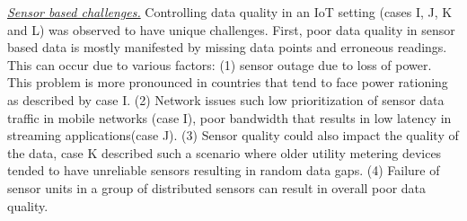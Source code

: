 \underline{\emph{Sensor based challenges.}} Controlling data quality in an IoT setting (cases I, J, K and L) was observed to have unique challenges. First, poor data quality in sensor based data is mostly manifested by missing data points and erroneous readings. This can occur due to various factors: (1) sensor outage due to loss of power. This problem is more pronounced in countries that tend to face power rationing as described by case I. (2) Network issues such low prioritization of sensor data traffic in mobile networks (case I), poor bandwidth that results in low latency in streaming applications(case J). (3) Sensor quality could also impact the quality of the data, case K described such a scenario where older utility metering devices tended to have unreliable sensors resulting in random data gaps. (4) Failure of sensor units in a group of distributed sensors can result in overall poor data quality. %






